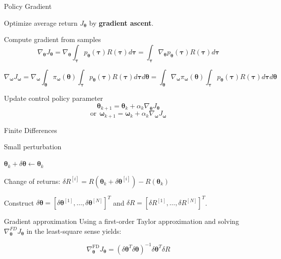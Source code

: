 \documentclass[10pt]{beamer}
\begin{document}
\begin{frame}{Policy Gradient}

Optimize average return $J_{\bm{\theta}}$ by \textbf{gradient ascent}.
\vspace{1em}

\begin{alertblock}{Compute gradient from samples}
$$\nabla_{\bm{\theta}} J_{\bm{\theta}}
 = \nabla_{\bm{\theta}} \int_{\bm{\tau}} p_{\bm{\theta}}({\bm{\tau}}) R({\bm{\tau}}) d{\bm{\tau}}
 = \int_{\bm{\tau}} \nabla_{\bm{\theta}} p_{\bm{\theta}}({\bm{\tau}}) R({\bm{\tau}}) d{\bm{\tau}} $$

$$
 \nabla_{\bm{\omega}} J_{\bm{\omega}}
 = 
 \nabla_{\bm{\omega}} \int_{\bm{\theta}} \pi_{\bm{\omega}}(\bm{\theta}) 
 \int_{\bm{\tau}} p_{\bm{\theta}}({\bm{\tau}}) R({\bm{\tau}}) d{\bm{\tau}} d{\bm{\theta}} 
 = 
 \int_{\bm{\theta}} \nabla_{\bm{\omega}} \pi_{\bm{\omega}}(\bm{\theta}) 
 \int_{\bm{\tau}} p_{\bm{\theta}}({\bm{\tau}}) R({\bm{\tau}}) d{\bm{\tau}} d{\bm{\theta}}
 $$
\end{alertblock}

\begin{alertblock}{Update control policy parameter}
 $${\bm{\theta}}_{k+1} = {\bm{\theta}}_k + \alpha_k \nabla_{\bm{\theta}} J_{\bm{\theta}} $$
$$ \text{or} \ \
{\bm{\omega}}_{k+1} = {\bm{\omega}}_k + \alpha_k \nabla_{\bm{\omega}} J_{\bm{\omega}} $$
\end{alertblock}

\end{frame}

\begin{frame}{Finite Differences}

\begin{alertblock}{Small perturbation}

${\bm{\theta}}_k + \delta {\bm{\theta}} \leftarrow {\bm{\theta}}_k $

Change of returns: $\delta R^{[i]} = R({\bm{\theta}}_k + \delta {\bm{\theta}}^{[i]}) - R({\bm{\theta}}_k)$

Construct $\delta {\bm{\theta}} = {[ \delta {\bm{\theta}}^{[1]}, \dots, \delta {\bm{\theta}}^{[N]} ]}^T$ and $\delta R = {[ \delta R^{[1]}, \dots, \delta R^{[N]} ]}^T$.

\end{alertblock}
\vspace{1em}
\begin{exampleblock}{Gradient approximation}
Using a first-order Taylor approximation and solving $\nabla^{FD}_{\bm{\theta}} J_{\bm{\theta}}$ in the least-square sense yields:

$$ \nabla^{\textrm{FD}}_{\bm{\theta}} J_{\bm{\theta}} = {(\delta {\bm{\theta}}^T  \delta {\bm{\theta}})}^{-1} \delta {\bm{\theta}}^T \delta R $$

\end{exampleblock}

\end{frame}
\end{document}
